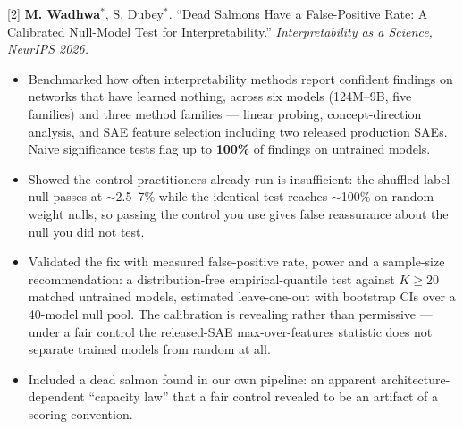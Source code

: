 \documentclass[letterpaper,10pt]{article}
\begin{document}
\vspace{3pt}
\small{[2] \textbf{M. Wadhwa}$^{*}$, S. Dubey$^{*}$. ``Dead Salmons Have a False-Positive Rate: A Calibrated Null-Model Test for Interpretability.'' \textit{Interpretability as a Science, NeurIPS 2026.}}
\begin{itemize}[leftmargin=0.3in, itemsep=1pt, topsep=2pt, parsep=0pt]
  \item \small Benchmarked how often interpretability methods report confident findings on networks that have learned nothing, across six models (124M--9B, five families) and three method families --- linear probing, concept-direction analysis, and SAE feature selection including two released production SAEs. Naive significance tests flag up to \textbf{100\%} of findings on untrained models.
  \item \small Showed the control practitioners already run is insufficient: the shuffled-label null passes at $\sim$2.5--7\% while the identical test reaches $\sim$100\% on random-weight nulls, so passing the control you use gives false reassurance about the null you did not test.
  \item \small Validated the fix with measured false-positive rate, power and a sample-size recommendation: a distribution-free empirical-quantile test against $K \geq 20$ matched untrained models, estimated leave-one-out with bootstrap CIs over a 40-model null pool. The calibration is revealing rather than permissive --- under a fair control the released-SAE max-over-features statistic does not separate trained models from random at all.
  \item \small Included a dead salmon found in our own pipeline: an apparent architecture-dependent ``capacity law'' that a fair control revealed to be an artifact of a scoring convention.
\end{itemize}
\end{document}

